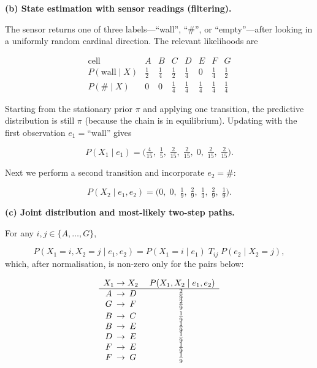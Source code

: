 \documentclass[11pt]{article}
\begin{document}

\bigskip
\textbf{(b) State estimation with sensor readings (filtering).}

The sensor returns one of three labels—``wall'', ``\#'', or ``empty''—after
looking in a uniformly random cardinal direction.  The relevant likelihoods are

\[
  \begin{array}{c|ccccccc}
    \text{cell} & A & B & C & D & E & F & G\\ \hline
    P(\text{wall}\mid X) & \tfrac12 & \tfrac14 & \tfrac12 &
    \tfrac14 & 0 & \tfrac14 & \tfrac12 \\[2pt]
    P(\text{\#}\mid   X) & 0 & 0 & \tfrac14 & \tfrac14 &
    \tfrac14 & \tfrac14 & \tfrac14
  \end{array}
\]

Starting from the stationary prior \(\pi\) and applying one transition,
the predictive distribution is still \(\pi\) (because the chain is in equilibrium).
Updating with the first observation \(e_1=\text{``wall''}\) gives

\[
P(X_1\mid e_1)=
\bigl(
  \tfrac{4}{15},\;
  \tfrac15,\;
  \tfrac{2}{15},\;
  \tfrac{2}{15},\;
  0,\;
  \tfrac{2}{15},\;
  \tfrac{2}{15}
\bigr).
\]

Next we perform a second transition and incorporate \(e_2=\text{\#}\):

\[
P(X_2\mid e_1,e_2)=
\bigl(
  0,\;
  0,\;
  \tfrac19,\;
  \tfrac{2}{9},\;
  \tfrac13,\;
  \tfrac{2}{9},\;
  \tfrac19
\bigr).
\]

\bigskip
\textbf{(c) Joint distribution and most-likely two-step paths.}

For any \(i,j\in\{A,\dots,G\}\),

\[
P(X_1=i,X_2=j\mid e_1,e_2)=
P(X_1=i\mid e_1)\;T_{ij}\;P(e_2\mid X_2=j),
\]
which, after normalisation, is non-zero only for the pairs below:

\[
\begin{array}{c@{\;\to\;}c  c}
  X_1 & X_2 & \;P(X_1,X_2\mid e_1,e_2) \\ \hline
  A & D & \tfrac{2}{9} \\
  G & F & \tfrac{2}{9} \\[2pt]
  B & C & \tfrac19 \\
  B & E & \tfrac19 \\
  D & E & \tfrac19 \\
  F & E & \tfrac19 \\
  F & G & \tfrac19
\end{array}
\]
\end{document}
